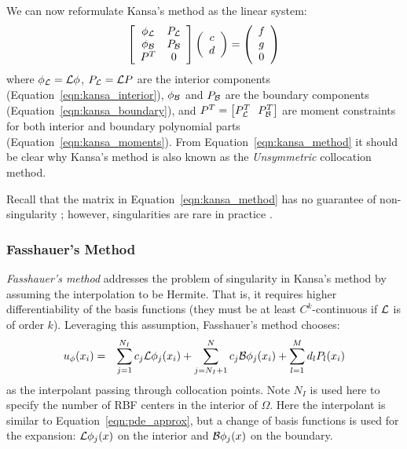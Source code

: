 \documentclass{report}
\begin{document}
{We can now reformulate Kansa's method as the linear system: 
\begin{eqnarray}
\left[ \begin{array}{c c} 
	\phi_{\mathcal{L}} & P_{\mathcal{L}} \\
	\phi_{\mathcal{B}} & P_{\mathcal{B}} \\
	P^T & 0
	\end{array} \right] \left( \begin{array}{c}
							{c} \\
							{d}
							 \end{array}
						 \right) = \left( \begin{array}{c}
							{f} \\
							{g} \\
							0
							 \end{array}
						 \right) 
	\label{eqn:kansa_method}
\end{eqnarray}
where $\phi_{\mathcal{L}} = \mathcal{L}\phi$, $P_{\mathcal{L}} = \mathcal{L}P$ are the interior components (Equation~\ref{eqn:kansa_interior}), $\phi_{\mathcal{B}}$ and $P_{\mathcal{B}}$ are the boundary components (Equation~\ref{eqn:kansa_boundary}), and $P^T = \left[P_\diffop{}^T \ \ P_\boundop{}^T\right]$ are moment constraints for both interior and boundary polynomial parts (Equation~\ref{eqn:kansa_moments}). From Equation~\ref{eqn:kansa_method} it should be clear why Kansa's method is also known as the \emph{Unsymmetric} collocation method. 

Recall that the matrix in Equation~\ref{eqn:kansa_method} has no guarantee of non-singularity \cite{Fasshauer1997}; however, singularities are rare in practice \cite{Larsson2003}. 

\subsubsection{Fasshauer's Method}

\emph{Fasshauer's method} \cite{Fasshauer1997} addresses the problem of singularity in Kansa's method by assuming the interpolation to be Hermite. That is, it requires higher differentiability of the basis functions (they must be at least $C^k$-continuous if $\mathcal{L}$ is of order $k$). Leveraging this assumption, Fasshauer's method chooses: 
\begin{eqnarray}
u_\phi(x_i) & = & \sum_{j=1}^{N_I}  c_j \mathcal{L}\phi_j(x_i) + \sum_{j=N_{I} + 1}^{N} c_j \mathcal{B}\phi_j(x_i) + \sum_{l=1}^{M}d_l P_l(x_i)
\label{eqn:fasshauer_approx}
\end{eqnarray}
as the interpolant passing through collocation points. Note $N_I$ is used here to specify the number of RBF centers in the interior of $\Omega$. Here the interpolant is similar to Equation~\ref{eqn:pde_approx}, but a change of basis functions is used for the expansion: $\mathcal{L}\phi_j(x)$ on the interior and $\mathcal{B}\phi_j(x)$ on the boundary.

}
\end{document}
